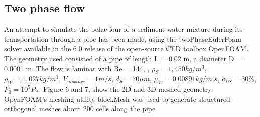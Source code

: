 \documentclass[review,3p,times,12pt]{elsarticle}
\begin{document}

\subsection{Two phase flow} \label{Two Phase}

An attempt to simulate the behaviour of a sediment-water mixture during its transportation through a pipe has been made, using the twoPhaseEulerFoam solver available in the 6.0 release of the open-source CFD toolbox OpenFOAM. The geometry used consisted of a pipe of length L = 0.02 m, a diameter D = 0.0001 m. The flow is laminar with Re = 144,  , $\rho_S= 1,450  kg/m^3$, $\rho_W= 1,027  kg/m^3$, $V_{mixture} = 1 m/s$, $d_S= 70 μm$, $\mu_W = 0.00891  kg/m.s$, $\alpha_{0S} = 30 \%$, $P_0=10^5  Pa$. Figure 6 and 7, show the 2D and 3D meshed geometry. OpenFOAM's meshing utility blockMesh was used to generate structured orthogonal meshes about 200 cells along the pipe.
\end{document}
